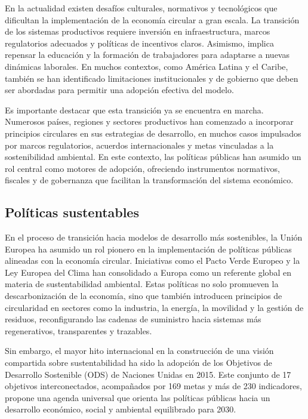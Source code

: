 En la actualidad existen desafíos culturales, normativos y tecnológicos que dificultan la implementación de la economía circular a gran escala. La transición de los sistemas productivos requiere inversión en infraestructura, marcos regulatorios adecuados y políticas de incentivos claros. Asimismo, implica repensar la educación y la formación de trabajadores para adaptarse a nuevas dinámicas laborales. En muchos contextos, como América Latina y el Caribe, también se han identificado limitaciones institucionales y de gobierno que deben ser abordadas para permitir una adopción efectiva del modelo.

Es importante destacar que esta transición ya se encuentra en marcha. Numerosos países, regiones y sectores productivos han comenzado a incorporar principios circulares en sus estrategias de desarrollo, en muchos casos impulsados por marcos regulatorios, acuerdos internacionales y metas vinculadas a la sostenibilidad ambiental. En este contexto, las políticas públicas han asumido un rol central como motores de adopción, ofreciendo instrumentos normativos, fiscales y de gobernanza que facilitan la transformación del sistema económico. %

\subsection{Políticas sustentables}

En el proceso de transición hacia modelos de desarrollo más sostenibles, la Unión Europea ha asumido un rol pionero en la implementación de políticas públicas alineadas con la economía circular. Iniciativas como el Pacto Verde Europeo y la Ley Europea del Clima han consolidado a Europa como un referente global en materia de sustentabilidad ambiental. Estas políticas no solo promueven la descarbonización de la economía, sino que también introducen principios de circularidad en sectores como la industria, la energía, la movilidad y la gestión de residuos, reconfigurando las cadenas de suministro hacia sistemas más regenerativos, transparentes y trazables.

Sin embargo, el mayor hito internacional en la construcción de una visión compartida sobre sustentabilidad ha sido la adopción de los Objetivos de Desarrollo Sostenible (ODS) de Naciones Unidas en 2015. Este conjunto de 17 objetivos interconectados, acompañados por 169 metas y más de 230 indicadores, propone una agenda universal que orienta las políticas públicas hacia un desarrollo económico, social y ambiental equilibrado para 2030.

